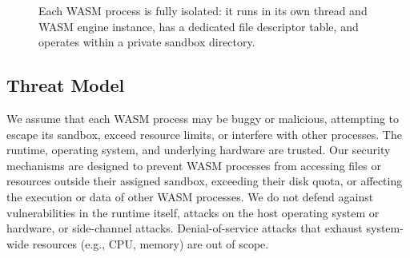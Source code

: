 \documentclass[10pt,a4paper,twocolumn]{IEEEtran}
\begin{document}
\begin{figure}[h]
    \centering
    \caption{Each WASM process is fully isolated: it runs in its own thread and WASM engine instance, has a dedicated file descriptor table, and operates within a private sandbox directory.}
    \label{fig:process-isolation}
\end{figure}

\subsection*{Threat Model}
We assume that each WASM process may be buggy or malicious, attempting to escape its sandbox, exceed resource limits, or interfere with other processes. The runtime, operating system, and underlying hardware are trusted. Our security mechanisms are designed to prevent WASM processes from accessing files or resources outside their assigned sandbox, exceeding their disk quota, or affecting the execution or data of other WASM processes. We do not defend against vulnerabilities in the runtime itself, attacks on the host operating system or hardware, or side-channel attacks. Denial-of-service attacks that exhaust system-wide resources (e.g., CPU, memory) are out of scope.
\end{document}
